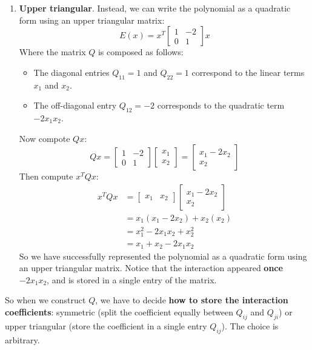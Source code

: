 \begin{examplebox}
\begin{enumerate}
        \item \textbf{Upper triangular}. Instead, we can write the polynomial as a quadratic form using an upper triangular matrix:
        \begin{equation*}
            E(x) = x^T \begin{bmatrix} 1 & -2 \\ 0 & 1 \end{bmatrix} x
        \end{equation*}
        Where the matrix $Q$ is composed as follows:
        \begin{itemize}
            \item The diagonal entries $Q_{11} = 1$ and $Q_{22} = 1$ correspond to the linear terms $x_1$ and $x_2$.
            \item The off-diagonal entry $Q_{12} = -2$ corresponds to the quadratic term $-2x_1 x_2$.
        \end{itemize}
        Now compote $Qx$:
        \begin{equation*}
            Qx = \begin{bmatrix} 1 & -2 \\ 0 & 1 \end{bmatrix} \begin{bmatrix} x_1 \\ x_2 \end{bmatrix} = \begin{bmatrix} x_1 - 2x_2 \\ x_2 \end{bmatrix}
        \end{equation*}
        Then compute $x^T Q x$:
        \begin{equation*}
            \begin{aligned}
                x^T Q x &= \begin{bmatrix} x_1 & x_2 \end{bmatrix} \begin{bmatrix} x_1 - 2x_2 \\ x_2 \end{bmatrix} \\
                &= x_1\left(x_1 - 2x_2\right) + x_2\left(x_2\right) \\
                &= x_1^2 - 2x_1 x_2 + x_2^2 \\
                &= x_1 + x_2 - 2x_1 x_2
            \end{aligned}
        \end{equation*}
        So we have successfully represented the polynomial as a quadratic form using an upper triangular matrix. Notice that the interaction appeared \textbf{once} $-2x_1 x_2$, and is stored in a single entry of the matrix.
    \end{enumerate}
    So when we construct $Q$, we have to decide \textbf{how to store the interaction coefficients}: symmetric (split the coefficient equally between $Q_{ij}$ and $Q_{ji}$) or upper triangular (store the coefficient in a single entry $Q_{ij}$). The choice is arbitrary.
\end{examplebox}

